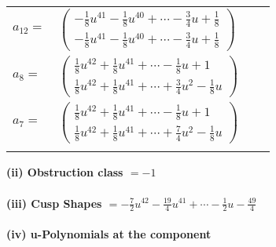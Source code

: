 \documentclass[1p]{elsarticle_modified}
\theoremstyle{definition}
\begin{document}
\begin{tabular}{m{7pt} m{180pt} m{7pt} m{180pt} }
\flushright $a_{12}=$&$\begin{pmatrix}-\frac{1}{8} u^{41}-\frac{1}{8} u^{40}+\cdots-\frac{3}{4} u+\frac{1}{8}\\-\frac{1}{8} u^{41}-\frac{1}{8} u^{40}+\cdots-\frac{3}{4} u+\frac{1}{8}\end{pmatrix}$ \\
\flushright $a_{8}=$&$\begin{pmatrix}\frac{1}{8} u^{42}+\frac{1}{8} u^{41}+\cdots-\frac{1}{8} u+1\\\frac{1}{8} u^{42}+\frac{1}{8} u^{41}+\cdots+\frac{3}{4} u^2-\frac{1}{8} u\end{pmatrix}$ \\
\flushright $a_{7}=$&$\begin{pmatrix}\frac{1}{8} u^{42}+\frac{1}{8} u^{41}+\cdots-\frac{1}{8} u+1\\\frac{1}{8} u^{42}+\frac{1}{8} u^{41}+\cdots+\frac{7}{4} u^2-\frac{1}{8} u\end{pmatrix}$\\&\end{tabular}
\flushleft \textbf{(ii) Obstruction class $= -1$}\\~\\
\flushleft \textbf{(iii) Cusp Shapes $= -\frac{7}{2} u^{42}-\frac{19}{4} u^{41}+\cdots-\frac{1}{2} u-\frac{49}{4}$}\\~\\
\newpage\renewcommand{\arraystretch}{1}
\flushleft \textbf{(iv) u-Polynomials at the component}\newline \\
\end{document}
